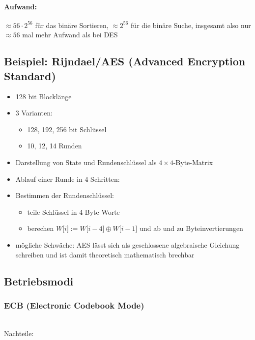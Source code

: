 \documentclass[a4paper,twoside,DIV15,BCOR12mm]{scrbook}
\begin{document}
\paragraph{Aufwand:} $\approx 56 \cdot 2^{56}$ für das binäre Sortieren, $\approx 2^{56}$ für die binäre Suche, insgesamt also nur $\approx 56$ mal mehr Aufwand als bei DES

\subsection{Beispiel: Rijndael/AES (Advanced Encryption Standard)}

\begin{itemize}
	\item 128 bit Blocklänge
	\item 3 Varianten:
		\begin{itemize}
			\item 128, 192, 256 bit Schlüssel
			\item 10, 12, 14 Runden
		\end{itemize}
	\item Darstellung von State und Rundenschlüssel als $4 \times 4$-Byte-Matrix
	\item Ablauf einer Runde in 4 Schritten: 
	\item Bestimmen der Rundenschlüssel:
		\begin{itemize}
			\item teile Schlüssel in 4-Byte-Worte
			\item berechen $W\lbrack i \rbrack := W\lbrack i-4 \rbrack \oplus W\lbrack i-1 \rbrack$ und ab und zu Byteinvertierungen
		\end{itemize}
	\item mögliche Schwäche: AES lässt sich als geschlossene algebraische Gleichung schreiben und ist damit theoretisch mathematisch brechbar
\end{itemize}

\subsection{Betriebsmodi}

\subsubsection{ECB (Electronic Codebook Mode)}

\\

Nachteile:
\end{document}
